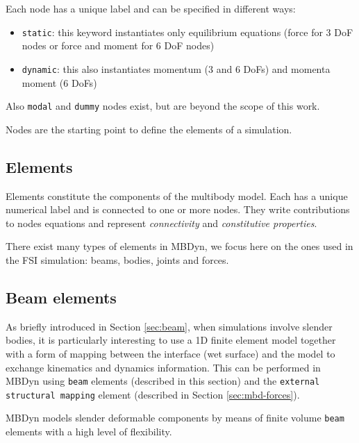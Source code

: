 Each node has a unique label and can be specified in different ways:

\begin{itemize}
	\item \texttt{static}: this keyword instantiates only equilibrium equations (force for 3 DoF nodes or force and moment for 6 DoF nodes)
	\item \texttt{dynamic}: this also instantiates momentum (3 and 6 DoFs) and momenta moment (6 DoFs)
\end{itemize}

Also \texttt{modal} and \texttt{dummy} nodes exist, but are beyond the scope of this work.

Nodes are the starting point to define the elements of a simulation.


\subsection{Elements}
\label{sec:mbd-elem}

Elements constitute the components of the multibody model. Each has a unique numerical label and is connected to one or more nodes. They write contributions to nodes equations and represent \textit{connectivity} and \textit{constitutive properties}.


There exist many types of elements in MBDyn, we focus here on the ones used in the FSI simulation: beams, bodies, joints and forces.



\subsection{Beam elements}
\label{sec:mbd-beam}

As briefly introduced in Section \ref{sec:beam}, when simulations involve slender bodies, it is particularly interesting to use a 1D finite element model together with a form of mapping between the interface (wet surface) and the model to exchange kinematics and dynamics information. This can be performed in MBDyn using \texttt{beam} elements (described in this section) and the \texttt{external structural mapping} element (described in Section \ref{sec:mbd-forces}).

MBDyn models slender deformable components by means of finite volume \texttt{beam} elements with a high level of flexibility.

